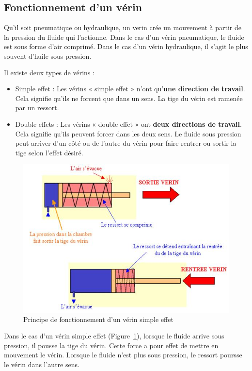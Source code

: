 \documentclass[10pt,fleqn]{article} %
\begin{document}
\subsection{Fonctionnement d'un vérin}
Qu'il soit pneumatique ou hydraulique, un verin crée un mouvement à partir de la pression du fluide qui l'actionne. Dans le cas d'un vérin pneumatique, le fluide est sous forme d'air comprimé. Dans le cas d'un vérin hydraulique, il s'agit le plus souvent d'huile sous pression.

Il existe deux types de vérins :
\begin{itemize}
  \item Simple effet : Les vérins « simple effet » n'ont qu'\textbf{une direction de travail}. Cela signifie qu'ils ne forcent que dans un sens. La tige du vérin est ramenée par un ressort.
  \item Double effets : Les vérins « double effet » ont \textbf{deux directions de travail}. Cela signifie qu'ils peuvent forcer dans les deux sens. Le fluide sous pression peut arriver d'un côté ou de l'autre du vérin pour faire rentrer ou sortir la tige selon l'effet désiré.
\end{itemize}

\begin{figure}[h]
  \centering
  \includegraphics[height=.2\textheight]{images/verin}
  \caption{Principe de fonctionnement d'un vérin simple effet}
  \label{fig:verin_simple}
\end{figure}

Dans le cas d'un vérin simple effet (Figure~\ref{fig:verin_simple}), lorsque le fluide arrive sous pression, il pousse la tige du vérin. Cette force a pour effet de mettre en mouvement le vérin. Lorsque le fluide n'est plus sous pression, le ressort poursse le vérin dans l'autre sens.
\end{document}
